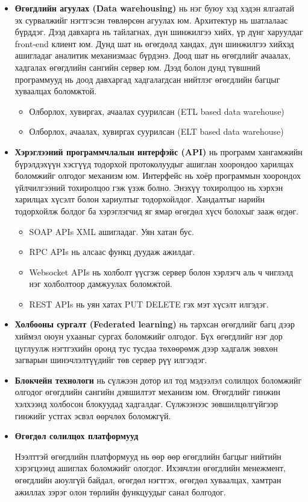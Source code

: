 \begin{itemize}
    \item \textbf{Өгөгдлийн агуулах (Data warehousing)} нь нэг буюу хэд хэдэн ялгаатай эх сурвалжийг нэгтгэсэн төвлөрсөн агуулах юм. Архитектур нь шатлалаас бүрддэг. Дээд давхарга нь тайлагнах, дүн шинжилгээ хийх, үр дүнг харуулдаг front-end клиент юм. Дунд шат нь өгөгдөлд хандах, дүн шинжилгээ хийхэд ашигладаг аналитик механизмаас бүрдэнэ. Доод шат нь өгөгдлийг ачаалах, хадгалах өгөгдлийн сангийн сервер юм. Дээд болон дунд түвшний программууд нь доод давхаргад хадгалагдсан нийтлэг өгөгдлийн багцыг хуваалцах боломжтой.
    \begin{itemize}
        \item Олборлох, хувиргах, ачаалах суурилсан (ETL based data warehouse)
        \item Олборлох, ачаалах, хувиргах суурилсан (ELT based data warehouse)
    \end{itemize}

    \item \textbf{Хэрэглээний программчлалын интерфэйс (API)} нь программ хангамжийн бүрэлдэхүүн хэсгүүд тодорхой протоколуудыг ашиглан хоорондоо харилцах боломжийг олгодог механизм юм. Интерфейс нь хоёр программын хоорондох үйлчилгээний тохиролцоо гэж үзэж болно. Энэхүү тохиролцоо нь хэрхэн харилцах хүсэлт болон хариултыг тодорхойлдог. Хандалтыг нарийн тодорхойлж болдог ба хэрэглэгчид яг ямар өгөгдөл хүсч болохыг зааж өгдөг.
    \begin{itemize}
        \item SOAP APIs XML ашигладаг. Уян хатан бус.
        \item RPC APIs нь алсаас функц дуудаж ажилдаг.
        \item Websocket APIs нь холболт үүсгэж сервер болон хэрлэгч аль ч чиглэлд нэг холболтоор дамжуулах боломжтой.
        \item REST APIs нь уян хатах PUT DELETE гэх мэт хүсэлт илгэдэг.
    \end{itemize}
    
    \item \textbf{Холбооны сургалт (Federated learning)} нь тархсан өгөгдлийг багц дээр хиймэл оюун ухааныг сургах боломжийг олгодог. Бүх өгөгдлийг нэг дор цуглуулж нэгтгэхийн оронд тус тусдаа төхөөрөмж дээр хадгалж зөвхөн загварын шинэчлэлтүүдийг төв сервер рүү илгээдэг.

    \item \textbf{Блокчейн технологи} нь сүлжээн дотор ил тод мэдээлэл солилцох боломжийг олгодог өгөгдлийн сангийн дэвшилтэт механизм юм. Өгөгдлийг гинжин хэлхээнд холбосон блокуудад хадгалдаг. Сүлжээнээс зөвшилцөлгүйгээр гинжийг устгах эсвэл өөрчлөх боломжгүй.

    \item \textbf{Өгөгдөл солилцох платформууд}
    
    Нээлттэй өгөгдлийн платформууд нь өөр өөр өгөгдлийн багцыг нийтийн хэрэгцээнд ашиглах боломжийг ологдог. Ихэвчлэн өгөгдлийн менежмент, өгөгдлийн аюулгүй байдал, өгөгдөл нэгтгэх, өгөгдөл хуваалцах, хамтран ажиллах зэрэг олон төрлийн функцуудыг санал болгодог. 

\end{itemize}

